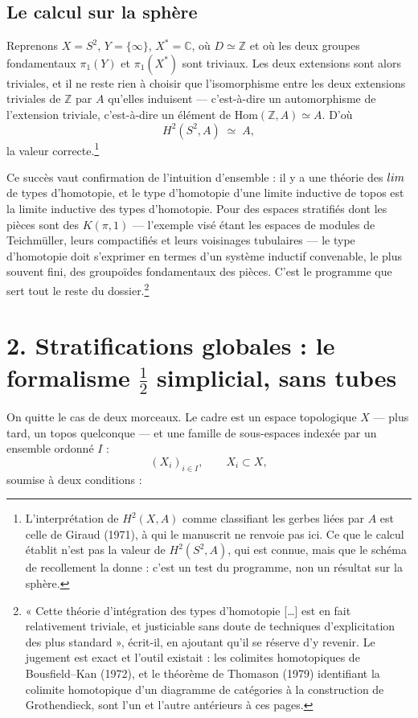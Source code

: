 \documentclass[11pt,a4paper]{article}
\begin{document}
\subsection*{Le calcul sur la sphère}

Reprenons $X = S^{2}$, $Y = \{\infty\}$, $X^{*} = \mathbb{C}$, où $D \simeq
\mathbb{Z}$ et où les deux groupes fondamentaux $\pi_{1}(Y)$ et
$\pi_{1}(X^{*})$ sont triviaux. Les deux extensions sont alors triviales, et il
ne reste rien à choisir que l'isomorphisme entre les deux extensions triviales
de $\mathbb{Z}$ par $A$ qu'elles induisent — c'est-à-dire un automorphisme de
l'extension triviale, c'est-à-dire un élément de
$\mathrm{Hom}(\mathbb{Z},A) \simeq A$. D'où
\[
  H^{2}(S^{2}, A) \;\simeq\; A,
\]
la valeur correcte.\footnote{L'interprétation de $H^{2}(X,A)$ comme classifiant
les gerbes liées par $A$ est celle de Giraud (1971), à qui le manuscrit ne
renvoie pas ici. Ce que le calcul établit n'est pas la valeur de
$H^{2}(S^{2},A)$, qui est connue, mais que le schéma de recollement la donne :
c'est un test du programme, non un résultat sur la sphère.}

Ce succès vaut confirmation de l'intuition d'ensemble : il y a une théorie des
$\varinjlim$ de types d'homotopie, et le type d'homotopie d'une limite inductive
de topos est la limite inductive des types d'homotopie. Pour des espaces
stratifiés dont les pièces sont des $K(\pi,1)$ — l'exemple visé étant les espaces
de modules de Teichmüller, leurs compactifiés et leurs voisinages tubulaires —
le type d'homotopie doit s'exprimer en termes d'un système inductif convenable,
le plus souvent fini, des groupoïdes fondamentaux des pièces. C'est le programme
que sert tout le reste du dossier.\footnote{« Cette théorie d'intégration des
types d'homotopie […] est en fait relativement triviale, et justiciable sans
doute de techniques d'explicitation des plus standard », écrit-il, en ajoutant
qu'il se réserve d'y revenir. Le jugement est exact et l'outil existait : les
colimites homotopiques de Bousfield--Kan (1972), et le théorème de Thomason
(1979) identifiant la colimite homotopique d'un diagramme de catégories à la
construction de Grothendieck, sont l'un et l'autre antérieurs à ces pages.}

\section*{2. Stratifications globales : le formalisme $\tfrac{1}{2}$ simplicial, sans tubes}

On quitte le cas de deux morceaux. Le cadre est un espace topologique $X$ — plus
tard, un topos quelconque — et une famille de sous-espaces indexée par un
ensemble ordonné $I$ :
\[
  (X_{i})_{i \in I}, \qquad X_{i} \subset X,
\]
soumise à deux conditions :
\end{document}
